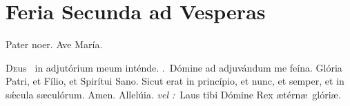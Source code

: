 \documentclass[12pt]{article} %
\newenvironment{response}{\leftskip 0in \setlength{\parindent}{0in}}{\vspace{2 mm}}
\def\vel{\textit{\textcolor{benred8}{vel :}}}
\let\oldVbar\Vbar
\renewcommand{\Vbar}{\textcolor{benred8}{\oldVbar .}}
\let\oldRbar\Rbar
\renewcommand{\Rbar}{\textcolor{benred8}{\oldRbar .}}
\let\oldAbar\Abar
\renewcommand{\Abar}{\textcolor{benred8}{\oldAbar .}}
\let\oldgrealtcross\grealtcross
\renewcommand{\grealtcross}{\textcolor{benred8}{\oldgrealtcross}}
\begin{document}


\newpage


\section*{Feria Secunda ad Vesperas}

\begin{center}Pater noer. Ave Mar\'{i}a.\end{center}

\thispagestyle{plain}

\begin{response}\lettrine{D}{e}us \grealtcross\ in adjut\'{o}rium meum int\'{e}nde. \Rbar\ D\'{o}mine ad adjuv\'{a}ndum me fe\'{i}na. Gl\'{o}ria Patri, et F\'{i}lio, et Spir\'{i}tui Sano. Sicut erat in princ\'{i}pio, et nunc, et semper, et in s\'{\ae}cula s\ae cul\'{o}rum. Amen. Allel\'{u}ia. \vel\ Laus tibi D\'{o}mine Rex \ae t\'{e}rn\ae\ gl\'{o}ri\ae .

\end{response}


\subsection*{}



\def\greinitialformat#1{%
{\fontsize{60}{60}\selectfont #1}%
}

\gresetfirstlineaboveinitial{\small \textsc{ \textbf{\textcolor{benred8}{1 \Abar\ I g 2}}}}{}%
\end{document}
